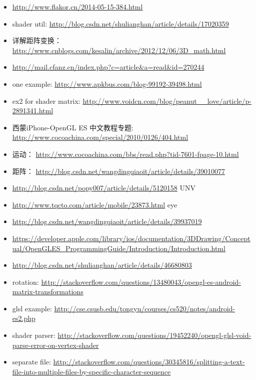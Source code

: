 \documentclass[9pt,b5paper]{article}
\begin{document}
\begin{itemize}
\item \url{http://www.flakor.cn/2014-05-15-384.html}
\item shader util: \url{http://blog.csdn.net/shulianghan/article/details/17020359}
\item 详解距阵变换：\url{http://www.cnblogs.com/kesalin/archive/2012/12/06/3D_math.html}
\item \url{http://mail.cfanz.cn/index.php?c=article&a=read&id=270244}
\item one example: \url{http://www.apkbus.com/blog-99192-39498.html}
\item ex2 for shader matrix: \url{http://www.voidcn.com/blog/peanut__love/article/p-2891341.html}
\item 西蒙iPhone-OpenGL ES 中文教程专题: \url{http://www.cocoachina.com/special/2010/0126/404.html}
\item 运动： \url{http://www.cocoachina.com/bbs/read.php?tid-7601-fpage-10.html}
\item 距阵： \url{http://blog.csdn.net/wangdingqiaoit/article/details/39010077}
\item \url{http://blog.csdn.net/popy007/article/details/5120158} UNV
\item \url{http://www.tqcto.com/article/mobile/23873.html} eye
\item \url{http://blog.csdn.net/wangdingqiaoit/article/details/39937019}
\item \url{https://developer.apple.com/library/ios/documentation/3DDrawing/Conceptual/OpenGLES_ProgrammingGuide/Introduction/Introduction.html}
\item \url{http://blog.csdn.net/shulianghan/article/details/46680803}
\item rotation: \url{http://stackoverflow.com/questions/13480043/opengl-es-android-matrix-transformations}
\item glsl example: \url{http://cse.csusb.edu/tongyu/courses/cs520/notes/android-es2.php}
\item shader parser: \url{http://stackoverflow.com/questions/19452240/opengl-glsl-void-parse-error-on-vertex-shader}
\item separate file: \url{http://stackoverflow.com/questions/30345816/splitting-a-text-file-into-multiple-files-by-specific-character-sequence}
\end{itemize}
\end{document}
